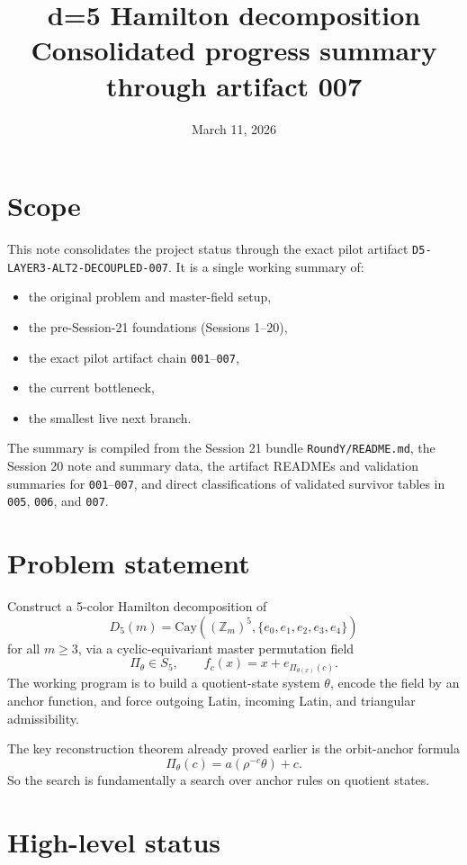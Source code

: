 \documentclass[11pt]{article}
\title{d=5 Hamilton decomposition\\Consolidated progress summary through artifact 007}
\author{}
\date{March 11, 2026}
\begin{document}
\maketitle

\section*{Scope}

This note consolidates the project status through the exact pilot artifact \texttt{D5-LAYER3-ALT2-DECOUPLED-007}. It is a single working summary of:
\begin{itemize}
    \item the original problem and master-field setup,
    \item the pre-Session-21 foundations (Sessions 1--20),
    \item the exact pilot artifact chain \texttt{001}--\texttt{007},
    \item the current bottleneck,
    \item the smallest live next branch.
\end{itemize}

The summary is compiled from the Session 21 bundle \texttt{RoundY/README.md}, the Session 20 note and summary data, the artifact READMEs and validation summaries for \texttt{001}--\texttt{007}, and direct classifications of validated survivor tables in \texttt{005}, \texttt{006}, and \texttt{007}.

\section*{Problem statement}

Construct a 5-color Hamilton decomposition of
\[
D_5(m)=\mathrm{Cay}((\mathbb Z_m)^5,\{e_0,e_1,e_2,e_3,e_4\})
\]
for all $m\ge 3$, via a cyclic-equivariant master permutation field
\[
\Pi_\theta\in S_5,
\qquad
f_c(x)=x+e_{\Pi_{\theta(x)}(c)}.
\]
The working program is to build a quotient-state system $\theta$, encode the field by an anchor function, and force outgoing Latin, incoming Latin, and triangular admissibility.

The key reconstruction theorem already proved earlier is the orbit-anchor formula
\[
\Pi_\theta(c)=a(\rho^{-c}\theta)+c.
\]
So the search is fundamentally a search over anchor rules on quotient states.

\section*{High-level status}
\end{document}
